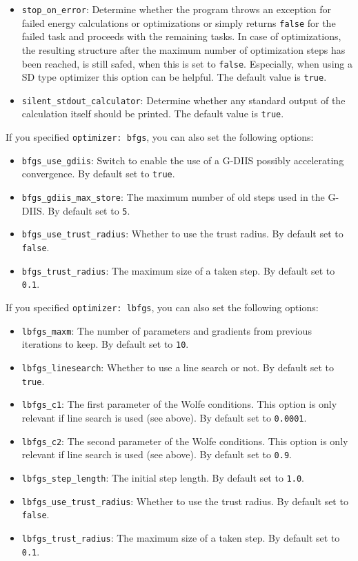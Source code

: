 \documentclass[]{tufte-book}
\begin{document}
\begin{itemize}
\item \texttt{stop\_on\_error}: Determine whether the program throws an exception for failed energy calculations or optimizations or simply returns \texttt{false} for the failed task and proceeds with the remaining tasks. In case of optimizations, the resulting structure after the maximum number of optimization steps has been reached, is still safed, when this is set to \texttt{false}. Especially, when using a SD type optimizer this option can be helpful. The default value is \texttt{true}.
\item \texttt{silent\_stdout\_calculator}: Determine whether any standard output of the calculation itself should be printed. The default value is \texttt{true}.
\end{itemize}

If you specified \texttt{optimizer: bfgs}, you can also set the following options:
\begin{itemize}
\item \texttt{bfgs\_use\_gdiis}: Switch to enable the use of a G-DIIS possibly accelerating convergence. By default set to
\texttt{true}.
\item \texttt{bfgs\_gdiis\_max\_store}: The maximum number of old steps used in the G-DIIS. By default set to \texttt{5}.
\item \texttt{bfgs\_use\_trust\_radius}: Whether to use the trust radius. By default set to \texttt{false}.
\item \texttt{bfgs\_trust\_radius}: The maximum size of a taken step. By default set to \texttt{0.1}.
\end{itemize}

If you specified \texttt{optimizer: lbfgs}, you can also set the following options:
\begin{itemize}
\item \texttt{lbfgs\_maxm}: The number of parameters and gradients from previous iterations to keep. By default set to
\texttt{10}.
\item \texttt{lbfgs\_linesearch}: Whether to use a line search or not. By default set to \texttt{true}.
\item \texttt{lbfgs\_c1}: The first parameter of the Wolfe conditions. This option is only relevant if line search is
used (see above). By default set to \texttt{0.0001}.
\item \texttt{lbfgs\_c2}:  The second parameter of the Wolfe conditions. This option is only relevant if line search is
used (see above). By default set to \texttt{0.9}.
\item \texttt{lbfgs\_step\_length}: The initial step length. By default set to \texttt{1.0}.
\item \texttt{lbfgs\_use\_trust\_radius}: Whether to use the trust radius. By default set to \texttt{false}.
\item \texttt{lbfgs\_trust\_radius}: The maximum size of a taken step. By default set to \texttt{0.1}.
\end{itemize}
\end{document}
